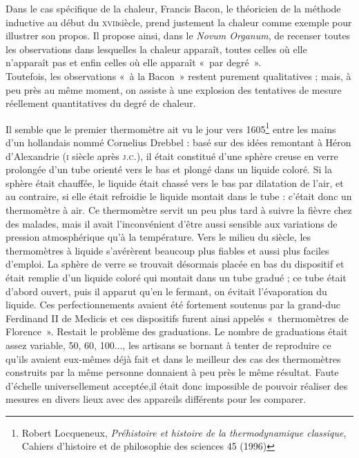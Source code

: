 	Dans le cas spécifique de la chaleur, Francis Bacon, le théoricien de la méthode inductive au début du \textsc{xvii}\ieme siècle, prend justement la chaleur comme exemple pour illustrer son propos. Il propose ainsi, dans le \textit{Novum Organum}, de recenser toutes les observations dans lesquelles la chaleur apparaît, toutes celles où elle n'apparaît pas et enfin celles où elle apparaît «~par degré~».\\
	Toutefois, les observations «~à la Bacon~» restent purement qualitatives ; mais, à peu près au même moment, on assiste à une explosion des tentatives de mesure réellement quantitatives du degré de chaleur.
	
	Il semble que le premier thermomètre ait vu le jour vers 1605\footnote{Robert Locqueneux, \textit{Préhistoire et histoire de la thermodynamique classique}, Cahiers d'histoire et de philosophie des sciences 45 (1996)} entre les mains d'un hollandais nommé Cornelius Drebbel : basé sur des idées remontant à Héron d'Alexandrie (\textsc{i}\xspace siècle après \textsc{j.c.}), il était constitué d'une sphère creuse en verre prolongée d'un tube orienté vers le bas et plongé dans un liquide coloré. Si la sphère était chauffée, le liquide était chassé vers le bas par dilatation de l'air, et au contraire, si elle était refroidie le liquide montait dans le tube : c'était donc un thermomètre à air. Ce thermomètre servit un peu plus tard à suivre la fièvre chez des malades, mais il avait l'inconvénient d'être aussi sensible aux variations de pression atmosphérique qu'à la température. Vers le milieu du siècle, les thermomètres à liquide s'avérèrent beaucoup plus fiables et aussi plus faciles d'emploi. La sphère de verre se trouvait désormais placée en bas du dispositif et était remplie d'un liquide coloré qui montait dans un tube gradué ; ce tube était d'abord ouvert, puis il apparut qu'en le fermant, on évitait l'évaporation du liquide. Ces perfectionnements avaient été fortement soutenus par la grand-duc Ferdinand II de Medicis et ces dispositifs furent ainsi appelés «~thermomètres de Florence~».
	Restait le problème des graduations. Le nombre de graduations était assez variable, 50, 60, 100..., les artisans se bornant à tenter de reproduire ce qu'ils avaient eux-mêmes déjà fait et dans le meilleur des cas des thermomètres construits par la même personne donnaient à peu près le même résultat. Faute d'échelle universellement acceptée,il était donc impossible de pouvoir réaliser des mesures en divers lieux avec des appareils différents pour les comparer.
